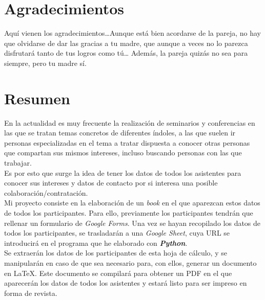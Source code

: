 \documentclass[a4paper, 12pt]{book}
\begin{document}

\chapter*{Agradecimientos}

Aquí vienen los agradecimientos\ldots Aunque está bien acordarse de la pareja, no hay que olvidarse de dar las gracias a tu madre, que aunque a veces no lo parezca disfrutará tanto de tus logros como tú\ldots
Además, la pareja quizás no sea para siempre, pero tu madre sí.


\chapter*{Resumen}
En la actualidad es muy frecuente la realización de seminarios y conferencias en las que se tratan temas concretos de diferentes índoles, a las que suelen ir personas especializadas en el tema a tratar dispuesta a conocer otras personas que compartan sus mismos intereses, incluso buscando personas con las que trabajar.\\

Es por esto que surge la idea de tener los datos de todos los asistentes para conocer sus intereses y datos de contacto por si interesa una posible colaboración/contratación.\\

Mi proyecto consiste en la elaboración de un \textit{book} en el que aparezcan estos datos de todos los participantes. Para ello, previamente los participantes tendrán que rellenar un formulario de \textit{Google Forms}. Una vez se hayan recopilado los datos de todos los participantes, se trasladarán a una \textit{Google Sheet}, cuya URL se introducirá en el programa que he elaborado con \textbf{\textit{Python}}.\\

Se extraerán los datos de los participantes de esta hoja de cálculo, y se manipularán en caso de que sea necesario para, con ellos, generar un documento en \LaTeX. Este documento se compilará para obtener un PDF en el que aparecerán los datos de todos los asistentes y estará listo para ser impreso en forma de revista.
\end{document}
